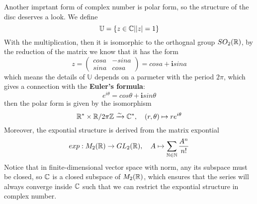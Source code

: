 \documentclass[en,geye,blue,pc,12pt]{elegantnote}
\begin{document}
Another imprtant form of complex number is polar form, so the structure of the disc deserves a look. We define
\[\mathbb{U} = \{z\in \mathbb{C} | |z| = 1 \}\]
With the multiplication, then it is isomorphic to the orthognal group \(SO_2(\mathbb{R})\), by the reduction of the matrix we know that it has the form
\[z = \begin{pmatrix}
  cosa & -sina \\
  sina & cosa 
\end{pmatrix}= cosa + \mathbf{i}sina\]
which means the details of \(\mathbb{U}\) depends on a parmeter with the period \(2 \pi\), which gives a connection with the \textbf{Euler's formula}:
\[e^{i \theta} = cos\theta + \mathbf{i} sin\theta\]
then the polar form is given by the isomorphism
\[\mathbb{R}^* \times \mathbb{R}/ 2\pi \mathbb{Z}  \xrightarrow{\sim} \mathbb{C}^*, \quad (r,\theta) \mapsto re^{i\theta}
\]
Moreover, the expontial structure is derived from the matrix expontial
\[exp: M_2(\mathbb{R}) \to GL_2(\mathbb{R}), \quad A \mapsto \sum_{\mathbb{N} \in \mathbb{N}} \frac{A^n}{n!}\]
Notice that in finite-dimensional vector space with norm, any its subspace must be closed, so \(\mathbb{C}\) is a closed subspace of \(M_2(\mathbb{R})\), which ensures that the series will always converge inside \(\mathbb{C}\) such that we can restrict the expontial structure in complex number.
\end{document}

